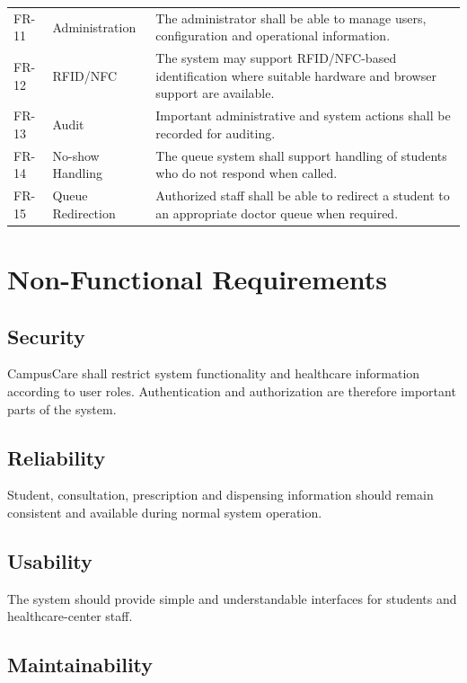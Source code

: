 \documentclass{tietreport}
\begin{document}
\begin{longtable}{p{1.3cm}p{4.0cm}p{7.0cm}}
FR-11 &
Administration &
The administrator shall be able to manage users, configuration and
operational information. \\

FR-12 &
RFID/NFC &
The system may support RFID/NFC-based identification where suitable
hardware and browser support are available. \\

FR-13 &
Audit &
Important administrative and system actions shall be recorded for
auditing. \\

FR-14 &
No-show Handling &
The queue system shall support handling of students who do not
respond when called. \\

FR-15 &
Queue Redirection &
Authorized staff shall be able to redirect a student to an
appropriate doctor queue when required. \\

\bottomrule
\end{longtable}

\section{Non-Functional Requirements}

\subsection{Security}

CampusCare shall restrict system functionality and healthcare
information according to user roles. Authentication and
authorization are therefore important parts of the system.

\subsection{Reliability}

Student, consultation, prescription and dispensing information should
remain consistent and available during normal system operation.

\subsection{Usability}

The system should provide simple and understandable interfaces for
students and healthcare-center staff.

\subsection{Maintainability}
\end{document}
